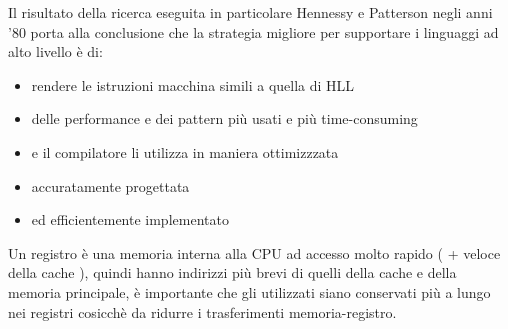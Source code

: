 \documentclass[arch.tex]{subfiles}
\begin{document}
%
\label{par:esito_ricerca}
Il risultato della ricerca eseguita in particolare Hennessy e Patterson negli anni '80 porta 
alla conclusione che la strategia migliore per supportare i linguaggi ad alto livello è di:

\begin{itemize}
	\item {} rendere le istruzioni macchina simili a quella di HLL
	\item {} delle performance e dei pattern più usati e 
		più time-consuming
	\item {} e il compilatore li utilizza in maniera 
		ottimizzzata
	\item {} accuratamente progettata
	\item {} ed efficientemente implementato
\end{itemize}

%
\label{par:uso_dei_regsitri}
Un registro è una memoria interna alla CPU ad accesso molto rapido ( + veloce della cache ), 
quindi hanno indirizzi più brevi di quelli della cache e della memoria principale,
è importante che gli  utilizzati siano conservati più a lungo nei registri
cosicchè da ridurre i trasferimenti memoria-registro.
\end{document}
